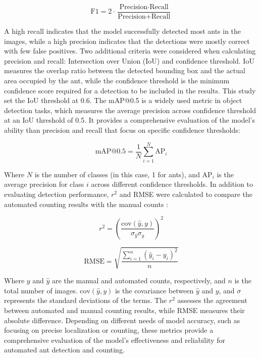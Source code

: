 \begin{equation}
\text{F1} = 2 \cdot \frac{\text{Precision} \cdot \text{Recall}}{\text{Precision} + \text{Recall}}
\end{equation}

A high recall indicates that the model successfully detected most ants in the images, while a high precision indicates that the detections were mostly correct with few false positives. Two additional criteria were considered when calculating precision and recall: Intersection over Union (IoU) and confidence threshold. IoU measures the overlap ratio between the detected bounding box and the actual area occupied by the ant, while the confidence threshold is the minimum confidence score required for a detection to be included in the results. This study set the IoU threshold at 0.6. The mAP@0.5 is a widely used metric in object detection tasks, which measures the average precision across confidence threshold at an IoU threshold of 0.5. It provides a comprehensive evaluation of the model's ability than precision and recall that focus on specific confidence thresholds:

\begin{equation}
\text{mAP@0.5} = \frac{1}{N} \sum_{i=1}^{N} \text{AP}_i
\end{equation}

Where $N$ is the number of classes (in this case, 1 for ants), and $\text{AP}_i$ is the average precision for class $i$ across different confidence thresholds. In addition to evaluating detection performance, $r^2$ and RMSE were calculated to compare the automated counting results with the manual counts :

\begin{equation}
r^2 = \left( \frac{\text{cov}(\hat{y}, y)}{\sigma_{\hat{y}} \sigma_y} \right)^2
\end{equation}

\begin{equation}
\text{RMSE} = \sqrt{ \frac{ \sum_{i=1}^{n} (\hat{y}_i - y_i)^2 }{ n } }
\end{equation}

Where $y$ and $\hat{y}$ are the manual and automated counts, respectively, and $n$ is the total number of images. $\text{cov}(\hat{y}, y)$ is the covariance between $\hat{y}$ and $y$, and $\sigma$ represents the standard deviations of the terms. The $r^2$ assesses the agreement between automated and manual counting results, while RMSE measures their absolute difference. Depending on different needs of model accuracy, such as focusing on precise localization or counting, these metrics provide a comprehensive evaluation of the model’s effectiveness and reliability for automated ant detection and counting.

